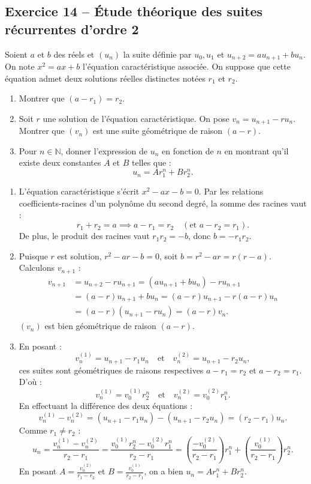 \documentclass[11pt,a4paper]{article}
\newcommand{\N}{\mathbb{N}}
\begin{document}
\subsection*{Exercice 14 -- Étude théorique des suites récurrentes d'ordre 2}
Soient $a$ et $b$ des réels et $(u_n)$ la suite définie par $u_0, u_1$ et $u_{n+2} = a u_{n+1} + b u_n$.
On note $x^2 = ax + b$ l'équation caractéristique associée. On suppose que cette équation admet deux solutions réelles distinctes notées $r_1$ et $r_2$.
\begin{enumerate}
    \item Montrer que $(a - r_1) = r_2$.
    \item Soit $r$ une solution de l'équation caractéristique. On pose $v_n = u_{n+1} - r u_n$. Montrer que $(v_n)$ est une suite géométrique de raison $(a - r)$.
    \item Pour $n \in \N$, donner l'expression de $u_n$ en fonction de $n$ en montrant qu'il existe deux constantes $A$ et $B$ telles que :
    \[
    u_n = A r_1^n + B r_2^n.
    \]
\end{enumerate}

\begin{correctionbox}
\begin{enumerate}
    \item L'équation caractéristique s'écrit $x^2 - ax - b = 0$. Par les relations coefficients-racines d'un polynôme du second degré, la somme des racines vaut :
    \[
    r_1 + r_2 = a \implies a - r_1 = r_2 \quad (\text{et } a - r_2 = r_1).
    \]
    De plus, le produit des racines vaut $r_1 r_2 = -b$, donc $b = -r_1 r_2$.
    \item Puisque $r$ est solution, $r^2 - ar - b = 0$, soit $b = r^2 - ar = r(r-a)$. Calculons $v_{n+1}$ :
    \begin{align*}
    v_{n+1} &= u_{n+2} - r u_{n+1} = (a u_{n+1} + b u_n) - r u_{n+1} \\
    &= (a - r) u_{n+1} + b u_n = (a - r) u_{n+1} - r(a - r) u_n \\
    &= (a - r)(u_{n+1} - r u_n) = (a - r) v_n.
    \end{align*}
    $(v_n)$ est bien géométrique de raison $(a - r)$.
    \item En posant :
    \[
    v_n^{(1)} = u_{n+1} - r_1 u_n \quad \text{et} \quad v_n^{(2)} = u_{n+1} - r_2 u_n,
    \]
    ces suites sont géométriques de raisons respectives $a - r_1 = r_2$ et $a - r_2 = r_1$. D'où :
    \[
    v_n^{(1)} = v_0^{(1)} r_2^n \quad \text{et} \quad v_n^{(2)} = v_0^{(2)} r_1^n.
    \]
    En effectuant la différence des deux équations :
    \[
    v_n^{(1)} - v_n^{(2)} = (u_{n+1} - r_1 u_n) - (u_{n+1} - r_2 u_n) = (r_2 - r_1) u_n.
    \]
    Comme $r_1 \ne r_2$ :
    \[
    u_n = \frac{v_n^{(1)} - v_n^{(2)}}{r_2 - r_1} = \frac{v_0^{(1)} r_2^n - v_0^{(2)} r_1^n}{r_2 - r_1} = \left(\frac{-v_0^{(2)}}{r_2 - r_1}\right) r_1^n + \left(\frac{v_0^{(1)}}{r_2 - r_1}\right) r_2^n.
    \]
    En posant $A = \frac{v_0^{(2)}}{r_1 - r_2}$ et $B = \frac{v_0^{(1)}}{r_2 - r_1}$, on a bien $u_n = A r_1^n + B r_2^n$.
\end{enumerate}
\end{correctionbox}
\end{document}
